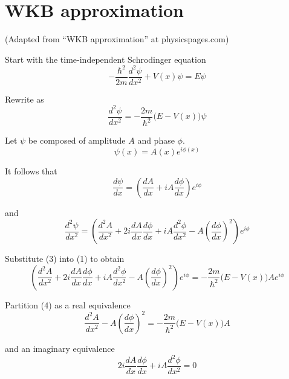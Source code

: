 

\section*{WKB approximation}

(Adapted from ``WKB approximation'' at physicspages.com)

\bigskip
Start with the time-independent Schrodinger equation
\begin{equation*}
-\frac{\hbar^2}{2m}\frac{d^2\psi}{dx^2}+V(x)\psi=E\psi
\end{equation*}

Rewrite as
\begin{equation*}
\frac{d^2\psi}{dx^2}=-\frac{2m}{\hbar^2}\bigl(E-V(x)\bigr)\psi
\tag{1}
\end{equation*}

Let $\psi$ be composed of amplitude $A$ and phase $\phi$.
\begin{equation*}
\psi(x)=A(x)e^{i\phi(x)}
\tag{2}
\end{equation*}

It follows that
\begin{equation*}
\frac{d\psi}{dx}=\left(\frac{dA}{dx}+iA\frac{d\phi}{dx}\right)e^{i\phi}
\end{equation*}

and
\begin{equation*}
\frac{d^2\psi}{dx^2}=\left(
\frac{d^2A}{dx^2}+2i\frac{dA}{dx}\frac{d\phi}{dx}
+iA\frac{d^2\phi}{dx^2}-A\left(\frac{d\phi}{dx}\right)^2
\right)e^{i\phi}
\tag{3}
\end{equation*}

Substitute (3) into (1) to obtain
\begin{equation*}
\left(
\frac{d^2A}{dx^2}+2i\frac{dA}{dx}\frac{d\phi}{dx}
+iA\frac{d^2\phi}{dx^2}-A\left(\frac{d\phi}{dx}\right)^2
\right)e^{i\phi}
=-\frac{2m}{\hbar^2}\bigl(E-V(x)\bigr)Ae^{i\phi}
\tag{4}
\end{equation*}

Partition (4) as a real equivalence
\begin{equation*}
\frac{d^2A}{dx^2}-A\left(\frac{d\phi}{dx}\right)^2
=-\frac{2m}{\hbar^2}\bigl(E-V(x)\bigr)A
\tag{5}
\end{equation*}

and an imaginary equivalence
\begin{equation*}
2i\frac{dA}{dx}\frac{d\phi}{dx}+iA\frac{d^2\phi}{dx^2}=0
\tag{6}
\end{equation*}

